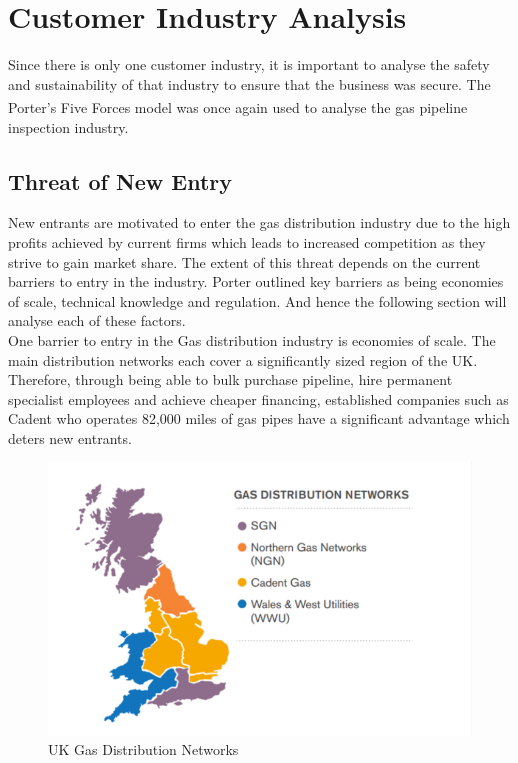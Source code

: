 \documentclass[11pt]{article}		%
\newcommand{\supercite}[1]{\textsuperscript{\cite{#1}}}		%
\begin{document}
	\section{Customer Industry Analysis}
		Since there is only one customer industry, it is important to analyse the safety and sustainability of that industry to ensure that the business was secure.
		The Porter's Five Forces model\supercite{porter2008five} was once again used to analyse the gas pipeline inspection industry.
			
		\subsection[Threat of New Entry]{Threat of New Entry}
				New entrants are motivated to enter the gas distribution industry due to the high profits achieved by current firms which leads to increased competition as they strive to gain market share. The extent of this threat depends on the current barriers to entry in the industry. Porter outlined key barriers as being economies of scale, technical knowledge and regulation. And hence the following section will analyse each of these factors. \\
				
				One barrier to entry in the Gas distribution industry is economies of scale. The main distribution networks each cover a significantly sized region of the UK. Therefore, through being able to bulk purchase pipeline, hire permanent specialist employees and achieve cheaper financing, established companies such as Cadent who operates 82,000 miles of gas pipes have a significant advantage which deters new entrants. \\
					\begin{figure}[h]
			    \centering
		    	\includegraphics[scale=0.8]{distribution.pdf}
			    \caption{UK Gas Distribution Networks} %
		    	\label{distrit}
	        	\end{figure}
				
\end{document}
